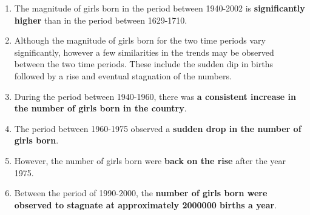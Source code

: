 \documentclass[11pt,a4paper,]{article}
\providecommand{\tightlist}{%
  \setlength{\itemsep}{0pt}\setlength{\parskip}{0pt}}
\begin{document}
\begin{enumerate}
\def\labelenumi{\arabic{enumi}.}
\tightlist
\item
  The magnitude of girls born in the period between 1940-2002 is \textbf{significantly higher} than in the period between 1629-1710.
\item
  Although the magnitude of girls born for the two time periods vary significantly, however a few similarities in the trends may be observed between the two time periods. These include the sudden dip in births followed by a rise and eventual stagnation of the numbers.
\item
  During the period between 1940-1960, there was \textbf{a consistent increase in the number of girls born in the country}.
\item
  The period between 1960-1975 observed a \textbf{sudden drop in the number of girls born}.
\item
  However, the number of girls born were \textbf{back on the rise} after the year 1975.
\item
  Between the period of 1990-2000, the \textbf{number of girls born were observed to stagnate at approximately 2000000 births a year}.
\end{enumerate}

\tiny
\end{document}
